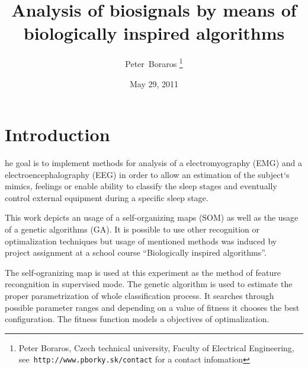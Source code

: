 \documentclass[a4paper]{IEEEtran}
\begin{document}
\title{Analysis of biosignals by means of\\ biologically inspired algorithms}
\date{May 29, 2011}
\author{Peter~Boraros %
\thanks{{Peter Boraros}, Czech technical university, Faculty of Electrical Engineering,
see~\texttt{http://www.pborky.sk/contact} for a contact infomation}}%



\maketitle
\IEEEdisplaynotcompsoctitleabstractindextext
\IEEEpeerreviewmaketitle


\section{Introduction}
he goal is to implement methods for analysis of
a electromyography (EMG) and a electroencephalography (EEG)
in order to allow an estimation of the subject`s mimics, 
feelings or enable ability to classify the sleep stages and eventually control 
external equipment during a specific sleep stage.

This work depicts an usage of a self-organizing maps (SOM) as well as the usage of a genetic
algorithms (GA). It is possible to use other recognition or optimalization
techniques but usage of mentioned 
methods was induced by project assignment at a school course ``Biologically inspired 
algorithms''.

The self-ogranizing map is used  at this experiment as the method of feature recongnition in 
supervised mode. The genetic algorithm is used to estimate the proper parametrization of 
whole classification process. It searches through possible parameter ranges and 
depending on a value of fitness it chooses the best configuration. The fitness function
models a objectives of optimalization.
\end{document}
